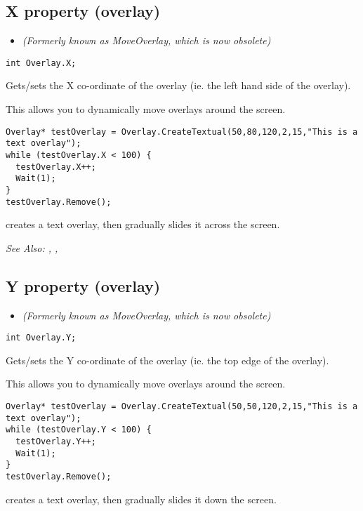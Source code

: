 \subsection{X property (overlay)}\label{Overlay.X}%

\begin{itemize}
\item \it{(Formerly known as MoveOverlay, which is now obsolete)}
\end{itemize}

\begin{verbatim}
int Overlay.X;
\end{verbatim}
Gets/sets the X co-ordinate of the overlay (ie. the left hand side of the overlay).

This allows you to dynamically move overlays around the screen.

\begin{verbatim}
Overlay* testOverlay = Overlay.CreateTextual(50,80,120,2,15,"This is a text overlay");
while (testOverlay.X < 100) {
  testOverlay.X++;
  Wait(1);
}
testOverlay.Remove();
\end{verbatim}
creates a text overlay, then gradually slides it across the screen.

\it{See Also:} ,
, 


\subsection{Y property (overlay)}\label{Overlay.Y}%

\begin{itemize}
\item \it{(Formerly known as MoveOverlay, which is now obsolete)}
\end{itemize}

\begin{verbatim}
int Overlay.Y;
\end{verbatim}
Gets/sets the Y co-ordinate of the overlay (ie. the top edge of the overlay).

This allows you to dynamically move overlays around the screen.

\begin{verbatim}
Overlay* testOverlay = Overlay.CreateTextual(50,50,120,2,15,"This is a text overlay");
while (testOverlay.Y < 100) {
  testOverlay.Y++;
  Wait(1);
}
testOverlay.Remove();
\end{verbatim}
creates a text overlay, then gradually slides it down the screen.

